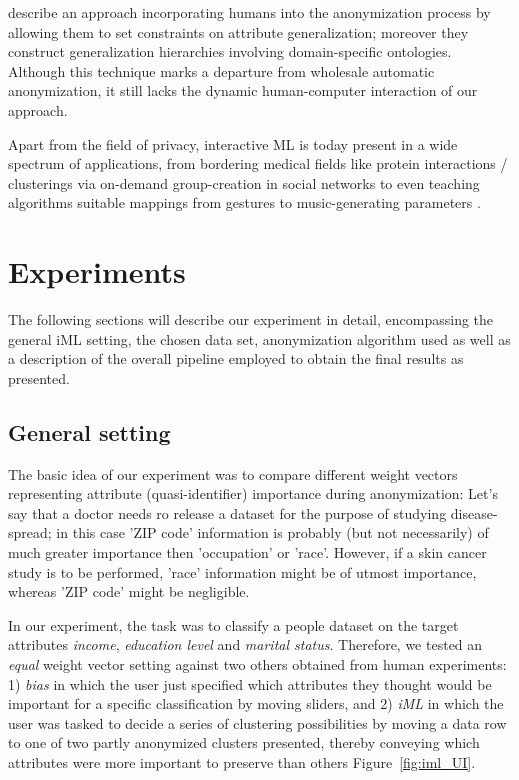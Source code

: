 \documentclass{llncs}
\begin{document}
\cite{Loh2010} describe an approach incorporating humans into the anonymization process by allowing them to set constraints on attribute generalization; moreover they construct generalization hierarchies involving domain-specific ontologies. Although this technique marks a departure from wholesale automatic anonymization, it still lacks the dynamic human-computer interaction of our approach.

Apart from the field of privacy, interactive ML is today present in a wide spectrum of applications, from bordering medical fields like protein interactions / clusterings \cite{Amershi2014} via on-demand group-creation in social networks \cite{Amershi2012} to even teaching algorithms suitable mappings from gestures to music-generating parameters \cite{Fiebrink2009}.



\section{Experiments}
\label{sect:experiments}

The following sections will describe our experiment in detail, encompassing the general iML setting, the chosen  data set, anonymization algorithm used as well as a description of the overall pipeline employed to obtain the final results as presented.


\subsection{General setting}
\label{sect:setting}

The basic idea of our experiment was to compare different weight vectors representing attribute (quasi-identifier) importance during anonymization: Let's say that a doctor needs ro release a dataset for the purpose of studying disease-spread; in this case 'ZIP code' information is probably (but not necessarily) of much greater importance then 'occupation' or 'race'. However, if a skin cancer study is to be performed, 'race' information might be of utmost importance, whereas 'ZIP code' might be negligible.

In our experiment, the task was to classify a people dataset on the target attributes \textit{income}, \textit{education level} and \textit{marital status}. Therefore, we tested an \textit{equal} weight vector setting against two others obtained from human experiments: 1) \textit{bias} in which the user just specified which attributes they thought would be important for a specific classification by moving sliders, and 2) \textit{iML} in which the user was tasked to decide a series of clustering possibilities by moving a data row to one of two partly anonymized clusters presented, thereby conveying which attributes were more important to preserve than others Figure~\ref{fig:iml_UI}.
\end{document}
